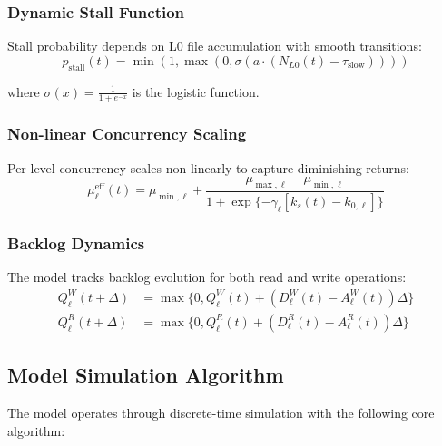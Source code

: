 \documentclass[11pt,twocolumn]{article}
\newcommand{\pstall}{p_{\text{stall}}}
\newcommand{\mueff}{\mu^{\text{eff}}}
\begin{document}
\subsubsection{Dynamic Stall Function}
Stall probability depends on L0 file accumulation with smooth transitions:
\begin{equation}
\pstall(t) = \min(1, \max(0, \sigma(a \cdot (N_{L0}(t) - \tau_{\text{slow}}))))
\end{equation}

where $\sigma(x) = \frac{1}{1 + e^{-x}}$ is the logistic function.

\subsubsection{Non-linear Concurrency Scaling}
Per-level concurrency scales non-linearly to capture diminishing returns:
\begin{equation}
\mueff_\ell(t) = \mu_{\min,\ell} + \frac{\mu_{\max,\ell} - \mu_{\min,\ell}}{1 + \exp\{-\gamma_\ell [k_s(t) - k_{0,\ell}]\}}
\end{equation}

\subsubsection{Backlog Dynamics}
The model tracks backlog evolution for both read and write operations:
\begin{align}
Q^W_\ell(t+\Delta) &= \max\{0, Q^W_\ell(t) + (D^W_\ell(t) - A^W_\ell(t)) \Delta\} \\
Q^R_\ell(t+\Delta) &= \max\{0, Q^R_\ell(t) + (D^R_\ell(t) - A^R_\ell(t)) \Delta\}
\end{align}

\subsection{Model Simulation Algorithm}

The model operates through discrete-time simulation with the following core algorithm:
\end{document}
